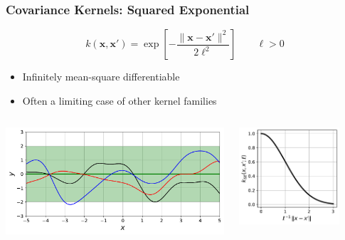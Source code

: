 \documentclass{beamer}
\newcommand{\vect}[1]{\boldsymbol{#1}}
\providecommand{\norm}[1]{\lVert#1\rVert}
\begin{document}
	\begin{frame}
		\frametitle{Covariance Kernels: Squared Exponential}
		\begin{equation*}
			k(\vect{x},\vect{x}')=\exp\left[-\frac{\norm{\vect{x}-\vect{x}'}^2}{2\ell^2}\right]\qquad\ell>0
		\end{equation*}
		\begin{itemize}
			\item Infinitely mean-square differentiable
			\item Often a limiting case of other kernel families
		\end{itemize}
		\begin{columns}
			\begin{column}{0.6\textwidth}
				\includegraphics[width=\textwidth]{figures/03a_gaussian_sample.pdf}
			\end{column}
			\hfill
			\begin{column}{0.4\textwidth}
				\begin{center}
					\includegraphics[width=0.8\textwidth]{figures/03a_gaussian.pdf}
				\end{center}
			\end{column}
		\end{columns}
	\end{frame}
\end{document}
